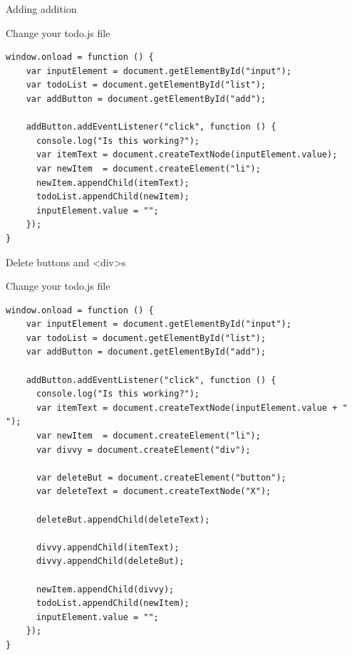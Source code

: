 \documentclass[notes]{beamer}
\begin{document}
\begin{frame}[fragile]{Adding addition}

  \begin{block}{Change your todo.js file}
    \begin{verbatim}
window.onload = function () {
    var inputElement = document.getElementById("input");
    var todoList = document.getElementById("list");
    var addButton = document.getElementById("add");

    addButton.addEventListener("click", function () {
      console.log("Is this working?");
      var itemText = document.createTextNode(inputElement.value);
      var newItem  = document.createElement("li");
      newItem.appendChild(itemText);
      todoList.appendChild(newItem);
      inputElement.value = "";
    });
} 
    \end{verbatim}
  \end{block}
\end{frame}

\begin{frame}[fragile]{Delete buttons and <div>s}
  \begin{block}{Change your todo.js file}
    \begin{verbatim}
window.onload = function () {
    var inputElement = document.getElementById("input");
    var todoList = document.getElementById("list");
    var addButton = document.getElementById("add");

    addButton.addEventListener("click", function () {
      console.log("Is this working?");
      var itemText = document.createTextNode(inputElement.value + " ");
      var newItem  = document.createElement("li");
      var divvy = document.createElement("div");

      var deleteBut = document.createElement("button");
      var deleteText = document.createTextNode("X");

      deleteBut.appendChild(deleteText);
	
      divvy.appendChild(itemText);
      divvy.appendChild(deleteBut);
	
      newItem.appendChild(divvy);
      todoList.appendChild(newItem);
      inputElement.value = "";
    });
}    
    \end{verbatim}
  \end{block}
\end{frame}
\end{document}
